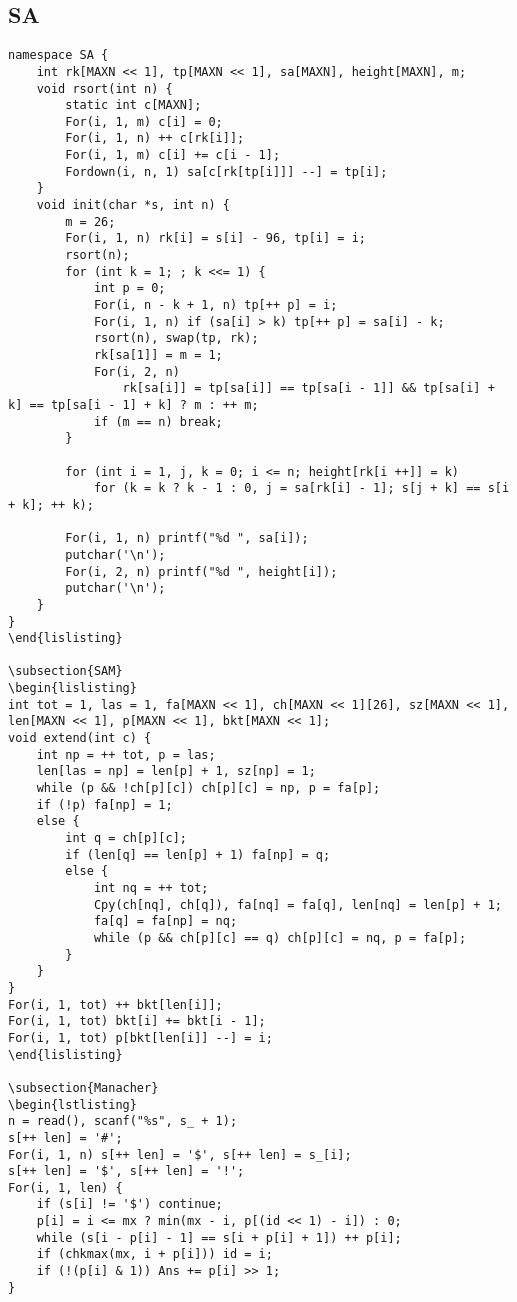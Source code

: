 \documentclass[twocolumn,a4]{article}
\begin{document}
\subsection{SA}
\begin{lstlisting}
namespace SA {
	int rk[MAXN << 1], tp[MAXN << 1], sa[MAXN], height[MAXN], m;
	void rsort(int n) {
		static int c[MAXN];
		For(i, 1, m) c[i] = 0;
		For(i, 1, n) ++ c[rk[i]];
		For(i, 1, m) c[i] += c[i - 1];
		Fordown(i, n, 1) sa[c[rk[tp[i]]] --] = tp[i];
	}
	void init(char *s, int n) {
		m = 26;
		For(i, 1, n) rk[i] = s[i] - 96, tp[i] = i;
		rsort(n);
		for (int k = 1; ; k <<= 1) {
			int p = 0;
			For(i, n - k + 1, n) tp[++ p] = i;
			For(i, 1, n) if (sa[i] > k) tp[++ p] = sa[i] - k;
			rsort(n), swap(tp, rk);
			rk[sa[1]] = m = 1;
			For(i, 2, n)
				rk[sa[i]] = tp[sa[i]] == tp[sa[i - 1]] && tp[sa[i] + k] == tp[sa[i - 1] + k] ? m : ++ m;
			if (m == n) break;
		}

		for (int i = 1, j, k = 0; i <= n; height[rk[i ++]] = k)
			for (k = k ? k - 1 : 0, j = sa[rk[i] - 1]; s[j + k] == s[i + k]; ++ k);

		For(i, 1, n) printf("%d ", sa[i]);
		putchar('\n');
		For(i, 2, n) printf("%d ", height[i]);
		putchar('\n');
	}
}
\end{lislisting}

\subsection{SAM}
\begin{lislisting}
int tot = 1, las = 1, fa[MAXN << 1], ch[MAXN << 1][26], sz[MAXN << 1], len[MAXN << 1], p[MAXN << 1], bkt[MAXN << 1];
void extend(int c) {
	int np = ++ tot, p = las;
	len[las = np] = len[p] + 1, sz[np] = 1;
	while (p && !ch[p][c]) ch[p][c] = np, p = fa[p];
	if (!p) fa[np] = 1;
	else {
		int q = ch[p][c];
		if (len[q] == len[p] + 1) fa[np] = q;
		else {
			int nq = ++ tot;
			Cpy(ch[nq], ch[q]), fa[nq] = fa[q], len[nq] = len[p] + 1;
			fa[q] = fa[np] = nq;
			while (p && ch[p][c] == q) ch[p][c] = nq, p = fa[p];
		}
	}
}
For(i, 1, tot) ++ bkt[len[i]];
For(i, 1, tot) bkt[i] += bkt[i - 1];
For(i, 1, tot) p[bkt[len[i]] --] = i;
\end{lislisting}

\subsection{Manacher}
\begin{lstlisting}
n = read(), scanf("%s", s_ + 1);
s[++ len] = '#';
For(i, 1, n) s[++ len] = '$', s[++ len] = s_[i];
s[++ len] = '$', s[++ len] = '!';
For(i, 1, len) {
    if (s[i] != '$') continue;
    p[i] = i <= mx ? min(mx - i, p[(id << 1) - i]) : 0;
    while (s[i - p[i] - 1] == s[i + p[i] + 1]) ++ p[i];
    if (chkmax(mx, i + p[i])) id = i;
    if (!(p[i] & 1)) Ans += p[i] >> 1;
}
\end{lstlisting}
\end{document}
